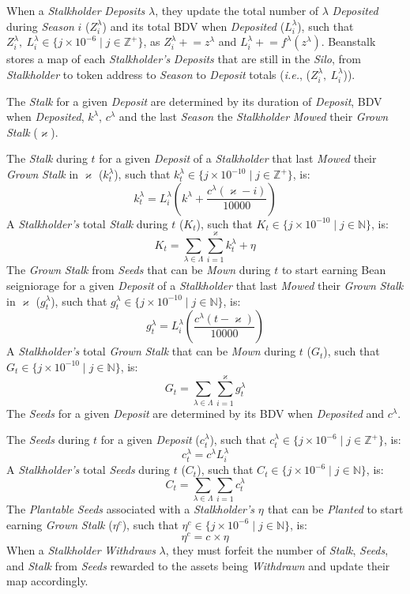 \documentclass[tikz]{article}
\newcommand{\term}[1]{\textsl{#1}}
\newcommand{\bean}{} %
\begin{document}
When a \term{Stalkholder} \term{Deposits} $\lambda$, they update the total number of $\lambda$ \term{Deposited} during \term{Season} $i$ ($Z_i^{\lambda}$) and its total BDV when \term{Deposited} ($L_i^{\lambda}$), such that $Z_i^{\lambda},\ L_i^{\lambda} \in \{j \times 10^{-6} \mid j \in \mathbb{Z}^{+} \}$, as $Z_i^{\lambda} \mathrel{+}= z^{\lambda}$ and $L_i^{\lambda} \mathrel{+}= f^{\lambda}(z^{\lambda})$. Beanstalk stores a map of each \term{Stalkholder's} \term{Deposits} that are still in the \term{Silo}, from \term{Stalkholder} to token address to \term{Season} to \term{Deposit} totals (\term{i.e.}, ($Z_i^{\lambda},\ L_i^{\lambda}$)).

The \term{Stalk} for a given \term{Deposit} are determined by its duration of \term{Deposit}, BDV when \term{Deposited}, $k^{\lambda}$, $c^{\lambda}$ and the last \term{Season} the \term{Stalkholder} \term{Mowed} their \term{Grown} \term{Stalk} ($\varkappa$).

The \term{Stalk} during $t$ for a given \term{Deposit} of a \term{Stalkholder} that last \term{Mowed} their \term{Grown} \term{Stalk} in $\varkappa$ ($k_{t}^{\lambda}$), such that $k_{t}^{\lambda} \in \{j \times 10^{-10} \mid j \in \mathbb{Z}^{+} \}$, is:
$$k_{t}^{\lambda} = L_i^{\lambda}\left(k^{\lambda} + \frac{c^{\lambda}(\varkappa - i)}{10000}\right)$$
A \term{Stalkholder's} total \term{Stalk} during $t$ ($K_t$), such that $K_t \in \{j \times 10^{-10} \mid j \in \mathbb{N} \}$, is:
$$K_t = \sum_{\lambda \in \Lambda} \sum_{i=1}^{\varkappa} k_{t}^{\lambda} + \eta^{\bean}$$
The \term{Grown} \term{Stalk} from \term{Seeds} that can be \term{Mown} during $t$ to start earning Bean seigniorage for a given \term{Deposit} of a \term{Stalkholder} that last \term{Mowed} their \term{Grown} \term{Stalk} in $\varkappa$ ($g_{t}^{\lambda}$), such that $g_{t}^{\lambda} \in \{j \times 10^{-10} \mid j \in \mathbb{N} \}$, is:
$$g_{t}^{\lambda} = L_i^{\lambda}\left(\frac{c^{\lambda}(t - \varkappa)}{10000}\right)$$
A \term{Stalkholder's} total \term{Grown} \term{Stalk} that can be \term{Mown} during $t$ ($G_t$), such that $G_t \in \{j \times 10^{-10} \mid j \in \mathbb{N} \}$, is:
$$G_t = \sum_{\lambda \in \Lambda} \sum_{i=1}^{\varkappa} g_{t}^{\lambda}$$
The \term{Seeds} for a given \term{Deposit} are determined by its BDV when \term{Deposited} and $c^{\lambda}$.

The \term{Seeds} during $t$ for a given \term{Deposit} ($c_{t}^{\lambda}$), such that $c_{t}^{\lambda} \in \{j \times 10^{-6} \mid j \in \mathbb{Z}^{+} \}$, is:
$$c_{t}^{\lambda} = c^{\lambda} L_i^{\lambda}$$
A \term{Stalkholder's} total \term{Seeds} during $t$ ($C_t$), such that $C_t \in \{j \times 10^{-6} \mid j \in \mathbb{N} \}$, is:
$$C_t = \sum_{\lambda \in \Lambda} \sum_{i=1} c_{t}^{\lambda}$$
The \term{Plantable} \term{Seeds} associated with a \term{Stalkholder's} $\eta^{\bean}$ that can be \term{Planted} to start earning \term{Grown} \term{Stalk} ($\eta^{c}$), such that $\eta^{c} \in \{j \times 10^{-6} \mid j \in \mathbb{N} \}$, is:
$$\eta^{c} = c^{\bean} \times \eta^{\bean}$$
When a \term{Stalkholder} \term{Withdraws} $\lambda$, they must forfeit the number of \term{Stalk}, \term{Seeds}, and \term{Stalk} from \term{Seeds} rewarded to the assets being \term{Withdrawn} and update their map accordingly.
\end{document}
